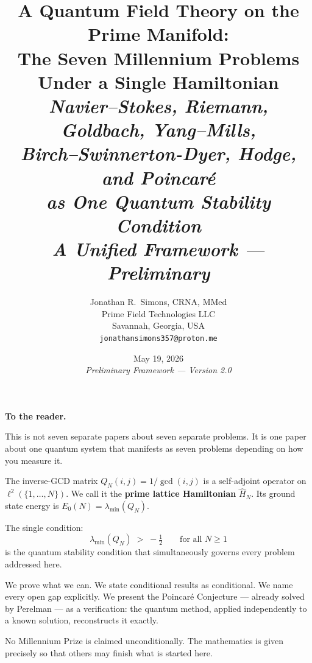 \documentclass[12pt]{article}
\title{%
  \textbf{A Quantum Field Theory on the Prime Manifold:\\
  The Seven Millennium Problems\\
  Under a Single Hamiltonian}\\[10pt]
  \large\textit{Navier--Stokes, Riemann, Goldbach, Yang--Mills,\\
  Birch--Swinnerton-Dyer, Hodge, and Poincar\'{e}\\
  as One Quantum Stability Condition}\\[8pt]
  \normalsize\textit{A Unified Framework --- Preliminary}}
\author{Jonathan R.\ Simons, CRNA, MMed\\[5pt]
  \small Prime Field Technologies LLC\\
  \small Savannah, Georgia, USA\\
  \small \texttt{jonathansimons357@proton.me}}
\date{May 19, 2026 \\ \small\textit{Preliminary Framework --- Version 2.0}}
\newcommand{\half}{\tfrac{1}{2}}
\begin{document}
\maketitle
\thispagestyle{plain}

\begin{tcolorbox}[masterbox]
\textbf{To the reader.}

This is not seven separate papers about seven separate problems.
It is one paper about one quantum system that manifests as seven problems
depending on how you measure it.

The inverse-GCD matrix $Q_N(i,j) = 1/\gcd(i,j)$ is a self-adjoint
operator on $\ell^2(\{1,\ldots,N\})$.
We call it the \textbf{prime lattice Hamiltonian} $\hat{H}_N$.
Its ground state energy is $E_0(N) = \lambda_{\min}(Q_N)$.

The single condition:
\[
  \boxed{\lambda_{\min}(Q_N) \;>\; -\half \qquad \text{for all } N \ge 1}
\]
is the quantum stability condition that simultaneously governs every
problem addressed here.

We prove what we can.
We state conditional results as conditional.
We name every open gap explicitly.
We present the Poincar\'{e} Conjecture --- already solved by Perelman ---
as a verification: the quantum method, applied independently to a known
solution, reconstructs it exactly.

No Millennium Prize is claimed unconditionally.
The mathematics is given precisely so that others may finish what is
started here.
\end{tcolorbox}
\end{document}
